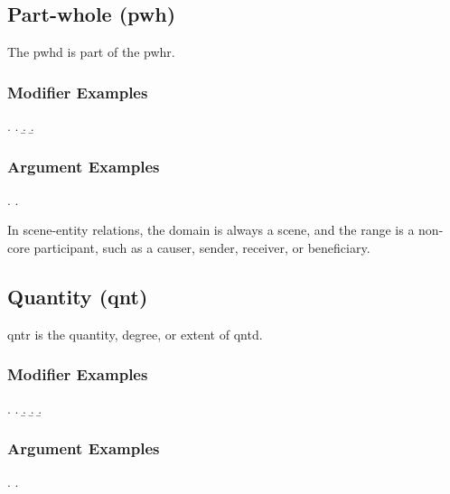 \documentclass[a4paper]{article}
\begin{document}
\clearpage
\subsection{Part-whole (\textsf{pwh})}
\label{sec:pwh}

The \textsf{pwhd} is part of the \textsf{pwhr}.

\subsubsection{Modifier Examples}

\ex.
\a. 
\b. 
\b. 

\subsubsection{Argument Examples}

\ex.
\a. 

In scene-entity relations, the domain is always a scene, and the range is a
non-core participant, such as a causer, sender, receiver, or beneficiary.


\clearpage
\subsection{Quantity (\textsf{qnt})}
\label{sec:qnt}

\textsf{qntr} is the quantity, degree, or extent of \textsf{qntd}.

\subsubsection{Modifier Examples}

\ex.
\a. 
\b. 
\b. 
\b. 

\subsubsection{Argument Examples}

\ex.
\a. 

\end{document}
